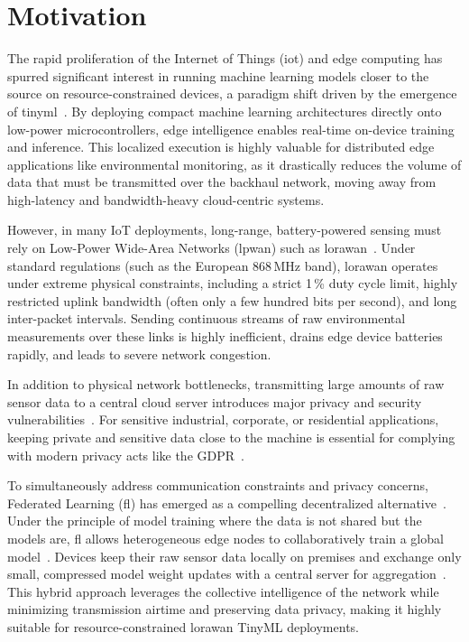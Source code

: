 \section{Motivation}
\label{sec:motivation}
The rapid proliferation of the Internet of Things (\gls{iot}) and edge computing has spurred significant interest in running machine learning models closer to the source on resource-constrained devices, a paradigm shift driven by the emergence of \gls{tinyml}~\cite{razaghi2026cefedavg, sanchez2024federated}. By deploying compact machine learning architectures directly onto low-power microcontrollers, edge intelligence enables real-time on-device training and inference. This localized execution is highly valuable for distributed edge applications like environmental monitoring, as it drastically reduces the volume of data that must be transmitted over the backhaul network, moving away from high-latency and bandwidth-heavy cloud-centric systems.

However, in many IoT deployments, long-range, battery-powered sensing must rely on Low-Power Wide-Area Networks (\gls{lpwan}) such as \gls{lorawan}~\cite{razaghi2026cefedavg}. Under standard regulations (such as the European 868\,MHz band), \gls{lorawan} operates under extreme physical constraints, including a strict 1\,\% duty cycle limit, highly restricted uplink bandwidth (often only a few hundred bits per second), and long inter-packet intervals. Sending continuous streams of raw environmental measurements over these links is highly inefficient, drains edge device batteries rapidly, and leads to severe network congestion.

In addition to physical network bottlenecks, transmitting large amounts of raw sensor data to a central cloud server introduces major privacy and security vulnerabilities~\cite{sanchez2024federated}. For sensitive industrial, corporate, or residential applications, keeping private and sensitive data close to the machine is essential for complying with modern privacy acts like the GDPR~\cite{ikram2026empirical, razaghi2026cefedavg}. 

To simultaneously address communication constraints and privacy concerns, Federated Learning (\gls{fl}) has emerged as a compelling decentralized alternative~\cite{ikram2026empirical}. Under the principle of model training where the data is not shared but the models are, \gls{fl} allows heterogeneous edge nodes to collaboratively train a global model~\cite{sanchez2024federated}. Devices keep their raw sensor data locally on premises and exchange only small, compressed model weight updates with a central server for aggregation~\cite{ikram2026empirical}. This hybrid approach leverages the collective intelligence of the network while minimizing transmission airtime and preserving data privacy, making it highly suitable for resource-constrained \gls{lorawan} TinyML deployments.
